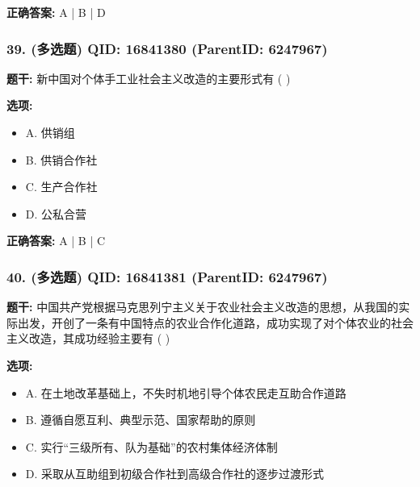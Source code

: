 \documentclass[12pt,UTF8]{ctexart}
\begin{document}
\textbf{正确答案:}
A | B | D

\vspace{0.3em}\hrulefill\vspace{0.7em}

\subsubsection*{39. (多选题) \small QID: 16841380 (ParentID: 6247967)}

\textbf{题干:}
新中国对个体手工业社会主义改造的主要形式有 ( )



\textbf{选项:}
\begin{itemize}[leftmargin=*]

  \item A. 供销组

  \item B. 供销合作社

  \item C. 生产合作社

  \item D. 公私合营

\end{itemize}

\textbf{正确答案:}
A | B | C

\vspace{0.3em}\hrulefill\vspace{0.7em}

\subsubsection*{40. (多选题) \small QID: 16841381 (ParentID: 6247967)}

\textbf{题干:}
中国共产党根据马克思列宁主义关于农业社会主义改造的思想，从我国的实际出发，开创了一条有中国特点的农业合作化道路，成功实现了对个体农业的社会主义改造，其成功经验主要有 ( )



\textbf{选项:}
\begin{itemize}[leftmargin=*]

  \item A. 在土地改革基础上，不失时机地引导个体农民走互助合作道路

  \item B. 遵循自愿互利、典型示范、国家帮助的原则

  \item C. 实行“三级所有、队为基础”的农村集体经济体制

  \item D. 采取从互助组到初级合作社到高级合作社的逐步过渡形式

\end{itemize}
\end{document}
